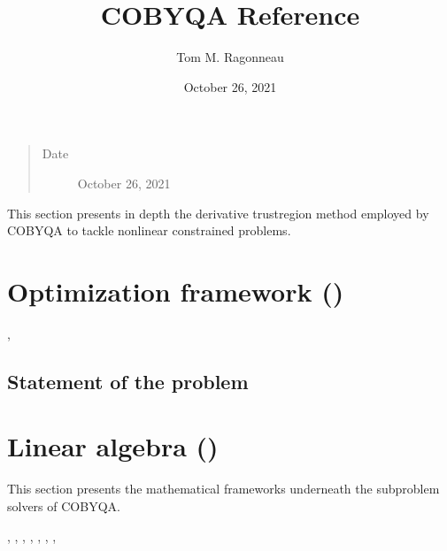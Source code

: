 \documentclass[letterpaper,10pt,english]{sphinxmanual}
\title{COBYQA Reference}
\date{October 26, 2021}
\author{Tom M. Ragonneau}
\begin{document}
\pagestyle{empty}
\sphinxmaketitle
\pagestyle{plain}
\sphinxtableofcontents
\pagestyle{normal}
\label{\detokenize{algo/index::doc}}

\begin{quote}\begin{description}
\item[{Date}] \leavevmode
\sphinxAtStartPar
October 26, 2021

\end{description}\end{quote}

\sphinxAtStartPar
This section presents in depth the derivative trust\sphinxhyphen{}region method employed by
COBYQA to tackle nonlinear constrained problems.


\chapter{Optimization framework ()}
\label{\detokenize{algo/optimize:optimization-framework-cobyqa}}\label{\detokenize{algo/optimize:optimize}}\label{\detokenize{algo/optimize::doc}}

\nopagebreak


\sphinxAtStartPar
{},




\section{Statement of the problem}
\label{\detokenize{algo/optimize:statement-of-the-problem}}

\chapter{Linear algebra ()}
\label{\detokenize{algo/linalg:linear-algebra-cobyqa-linalg}}\label{\detokenize{algo/linalg:linalg}}\label{\detokenize{algo/linalg::doc}}
\sphinxAtStartPar
This section presents the mathematical frameworks underneath the subproblem
solvers of COBYQA.


\nopagebreak


\sphinxAtStartPar
{},
,
,
,
,
,
,
\end{document}
